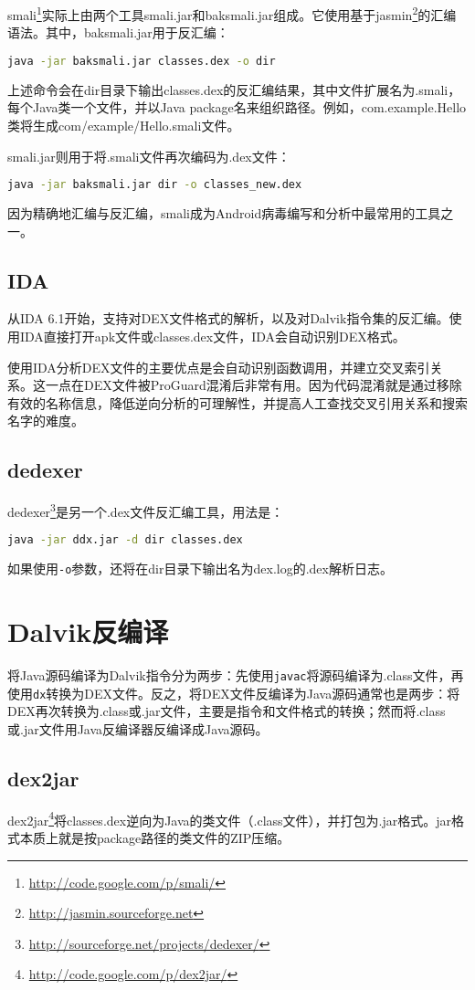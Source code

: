 smali\footnote{\url{http://code.google.com/p/smali/}}实际上由两个工具smali.jar和baksmali.jar组成。它使用基于jasmin\footnote{\url{http://jasmin.sourceforge.net}}的汇编语法。其中，baksmali.jar用于反汇编：
\begin{lstlisting}[language=bash, numbers=none]
java -jar baksmali.jar classes.dex -o dir
\end{lstlisting}
上述命令会在dir目录下输出classes.dex的反汇编结果，其中文件扩展名为.smali，每个Java类一个文件，并以Java package名来组织路径。例如，com.example.Hello类将生成com/example/Hello.smali文件。

smali.jar则用于将.smali文件再次编码为.dex文件：
\begin{lstlisting}[language=bash, numbers=none]
java -jar baksmali.jar dir -o classes_new.dex
\end{lstlisting}

因为精确地汇编与反汇编，smali成为Android病毒编写和分析中最常用的工具之一。
\subsection{IDA}
从IDA 6.1开始，支持对DEX文件格式的解析，以及对Dalvik指令集的反汇编。使用IDA直接打开apk文件或classes.dex文件，IDA会自动识别DEX格式。

使用IDA分析DEX文件的主要优点是会自动识别函数调用，并建立交叉索引关系。这一点在DEX文件被ProGuard混淆后非常有用。因为代码混淆就是通过移除有效的名称信息，降低逆向分析的可理解性，并提高人工查找交叉引用关系和搜索名字的难度。
\subsection{dedexer}
dedexer\footnote{\url{http://sourceforge.net/projects/dedexer/}}是另一个.dex文件反汇编工具，用法是：
\begin{lstlisting}[language=bash, numbers=none]
java -jar ddx.jar -d dir classes.dex
\end{lstlisting}
如果使用\lstinline!-o!参数，还将在dir目录下输出名为dex.log的.dex解析日志。
\section{Dalvik反编译}
将Java源码编译为Dalvik指令分为两步：先使用\lstinline!javac!将源码编译为.class文件，再使用\lstinline!dx!转换为DEX文件。反之，将DEX文件反编译为Java源码通常也是两步：将DEX再次转换为.class或.jar文件，主要是指令和文件格式的转换；然而将.class或.jar文件用Java反编译器反编译成Java源码。

\subsection{dex2jar}
dex2jar\footnote{\url{http://code.google.com/p/dex2jar/}}将classes.dex逆向为Java的类文件（.class文件），并打包为.jar格式。jar格式本质上就是按package路径的类文件的ZIP压缩。


